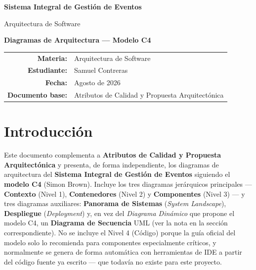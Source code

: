 \documentclass[12pt,a4paper]{article}
\begin{document}
\begin{titlepage}
\centering
\vspace*{2cm}
{\Huge\bfseries Sistema Integral de Gestión de Eventos\par}
\vspace{0.7cm}
{\Large Arquitectura de Software\par}
\vspace{1.2cm}
{\Large\bfseries Diagramas de Arquitectura --- Modelo C4\par}
\vspace{2cm}
\vfill
\begin{tabular}{rl}
\textbf{Materia:} & Arquitectura de Software\\
\textbf{Estudiante:} & Samuel Contreras\\
\textbf{Fecha:} & Agosto de 2026\\
\textbf{Documento base:} & Atributos de Calidad y Propuesta Arquitectónica
\end{tabular}
\end{titlepage}

\tableofcontents
\newpage

\section{Introducción}

Este documento complementa a \textbf{Atributos de Calidad y Propuesta Arquitectónica} y presenta,
de forma independiente, los diagramas de arquitectura del \textbf{Sistema Integral de Gestión de
Eventos} siguiendo el \textbf{modelo C4} (Simon Brown). Incluye los tres diagramas jerárquicos
principales --- \textbf{Contexto} (Nivel 1), \textbf{Contenedores} (Nivel 2) y \textbf{Componentes}
(Nivel 3) --- y tres diagramas auxiliares: \textbf{Panorama de Sistemas} (\textit{System
Landscape}), \textbf{Despliegue} (\textit{Deployment}) y, en vez del \textit{Diagrama Dinámico} que
propone el modelo C4, un \textbf{Diagrama de Secuencia} UML (ver la nota en la sección
correspondiente). No se
incluye el Nivel 4 (Código) porque la guía oficial del modelo solo lo recomienda para componentes
especialmente críticos, y normalmente se genera de forma automática con herramientas de IDE a
partir del código fuente ya escrito --- que todavía no existe para este proyecto.
\end{document}
